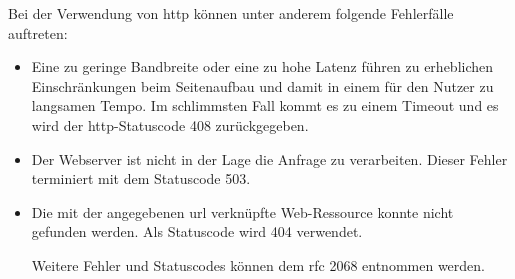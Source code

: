 \documentclass[titlepage]{report}
\begin{document}
Bei der Verwendung von \gls{http} können unter anderem folgende Fehlerfälle auftreten:
\begin{itemize}
    \item Eine zu geringe Bandbreite oder eine zu hohe Latenz führen zu
        erheblichen Einschränkungen beim Seitenaufbau und damit in einem
        für den Nutzer zu langsamen Tempo. Im schlimmsten Fall kommt es
        zu einem Timeout und es wird der \gls{http}\hyp{}Statuscode 408
        zurückgegeben\cite[Siehe Section 10.4.9]{RFC2068}.
    \item Der Webserver ist nicht in der Lage die Anfrage zu
        verarbeiten. Dieser Fehler terminiert mit dem Statuscode
        503\cite[Siehe Section 10.5.4]{RFC2068}.
    \item Die mit der angegebenen \gls{url} verknüpfte
        Web\hyp{}Ressource konnte nicht gefunden werden. Als Statuscode
        wird 404 verwendet\cite[Siehe Section 10.4.5]{RFC2068}.

Weitere Fehler und Statuscodes können dem \gls{rfc} 2068 entnommen werden\cite[Siehe Section 10]{RFC2068}.
\end{itemize}
\end{document}
